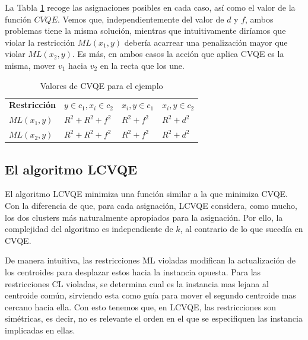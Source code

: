 La Tabla \ref{tab:tabla3} recoge las asignaciones posibles en cada caso, así como el valor de la función $CVQE$. Vemos que, independientemente del valor de $d$ y $f$, ambos problemas tiene la misma solución, mientras que intuitivamente diríamos que violar la restricción $ML(x_1, y)$ debería acarrear una penalización mayor que violar $ML(x_2, y)$. Es más, en ambos casos la acción que aplica \acs{CVQE} es la misma, mover $v_1$ hacia $v_2$ en la recta que los une.

\begin{table}[!h]
	\centering
	\setlength{\arrayrulewidth}{1mm}
	\setlength{\tabcolsep}{10pt}
	\renewcommand{\arraystretch}{0.9}
	
	\begin{tabular}{ >{\centering\arraybackslash}m{2cm}  >{\centering\arraybackslash}m{2.5cm}>{\centering\arraybackslash}m{2cm}>{\centering\arraybackslash}m{2cm}}
		\hline
		\rowcolor{black}
		\multicolumn{4}{c}{\bf \color{white}{Valores de CVQE}}\\
		\hline
		\rowcolor{gray!50}
		\textbf{Restricción} & \textbf{$y \in c_1, x_i \in c_2$} & \textbf{$x_i,y \in c_1$} & \textbf{$x_i,y \in c_2$}  \\
		$ML(x_1, y)$ & $R^2 + R^2 + f^2$ & $R^2 + f^2 $ & $R^2 + d^2 $  \\
		$ML(x_2, y)$ & $R^2 + R^2 + f^2$ & $R^2 + f^2 $ & $R^2 + d^2 $  \\
		\hline
		
	\end{tabular}
	\caption[Valores de CVQE para el ejemplo]{Valores de CVQE para el ejemplo \cite{CECM:2012}}
	\label{tab:tabla3}
\end{table}

\subsection{El algoritmo LCVQE}

El algoritmo \acs{LCVQE} minimiza una función similar a la que minimiza \acs{CVQE}. Con la diferencia de que, para cada asignación, \acs{LCVQE} considera, como mucho, los dos clusters más naturalmente apropiados para la asignación. Por ello, la complejidad del algoritmo es independiente de $k$, al contrario de lo que sucedía en \acs{CVQE}.

De manera intuitiva, las restricciones \acs{ML} violadas modifican la actualización de los centroides para desplazar estos hacia la instancia opuesta. Para las restricciones \acs{CL} violadas, se determina cual es la instancia mas lejana al centroide común, sirviendo esta como guía para mover el segundo centroide mas cercano hacia ella. Con esto tenemos que, en \acs{LCVQE}, las restricciones son simétricas, es decir, no es relevante el orden en el que se especifiquen las instancia implicadas en ellas.

